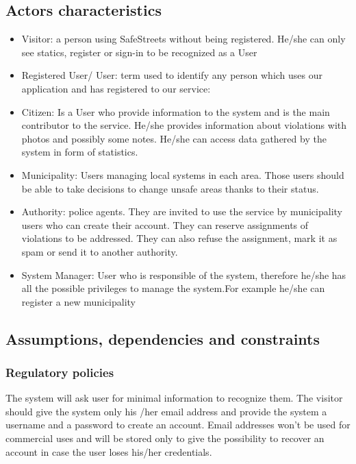\subsection{Actors characteristics}
\begin{itemize}
\item Visitor: a person using SafeStreets without being registered. He/she can only see statics, register or sign-in to be recognized as a User
\item Registered User/ User: term used to identify any person which uses our application and has registered to our service:
\item  Citizen: Is a User who provide information to the system and is the main contributor to the service.
He/she provides information about violations with photos and possibly some notes. He/she can access data gathered by the system in form of statistics.
\item Municipality: Users managing local systems in each area. Those users should be able to take decisions to change unsafe areas thanks to their status.
\item Authority: police agents. They are invited to use the service by municipality users who can create their account. They can reserve assignments of violations to be addressed. They can also refuse the assignment, mark it as spam or send it to another authority.
\item System Manager: User who is responsible of the system, therefore he/she has all the possible privileges to manage the system.For example he/she can register a new municipality
\end{itemize}
\subsection{Assumptions, dependencies and constraints}
\subsubsection {Regulatory policies}
The system will ask user for minimal information to recognize them. The visitor should give the system only his /her email address and provide the system a username and a password to create an account. Email addresses won’t be used for commercial uses and will be stored only to give the possibility to recover an account in case the user loses his/her credentials.
